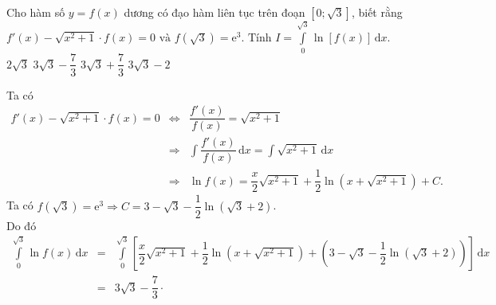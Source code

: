 \begin{ex}%
Cho hàm số $ y = f(x) $	 dương có đạo hàm  liên tục trên đoạn $ \left[0; \sqrt{3}\right] $, biết rằng $ f'(x) - \sqrt{x^2 + 1} \cdot f(x) = 0  \text{ và }  f\left(\sqrt{3}\right) = \mathrm{e}^3. \text{ Tính }  I = \displaystyle \int\limits_{0}^{\sqrt{3}} \ln \left[f(x)\right] \mathrm{\,d}x. $
	\choice
	{$ 2\sqrt{3} $}
	{\True $ 3 \sqrt{3} - \dfrac{7}{3} $}
	{$ 3 \sqrt{3} + \dfrac{7}{3} $}
	{$ 3 \sqrt{3} - 2 $}
	\loigiai
{
Ta có 
\begin{eqnarray*}
f'(x) - \sqrt{x^2 + 1} \cdot f(x) = 0 &\Leftrightarrow& \dfrac{f'(x)}{f(x)} = \sqrt{x^2 + 1}\\&\Rightarrow& \displaystyle \int \dfrac{f'(x)}{f(x)} \mathrm{\,d}x = \int \sqrt{x^2 + 1} \mathrm{\,d}x\\
&\Rightarrow & \ln f(x) = \dfrac{x}{2} \sqrt{x^2 + 1} +\dfrac{1}{2} \ln \left(x + \sqrt{x^2+1}\right)+C.
\end{eqnarray*}
Ta có $ f\left(\sqrt{3}\right) = \mathrm{e}^3 \Rightarrow C = 3 - \sqrt{3} - \dfrac{1}{2}\ln \left(\sqrt{3} + 2\right) $.\\
Do đó 
\begin{eqnarray*}
\displaystyle \int\limits_{0}^{\sqrt{3}} \ln f(x) \mathrm{\,d}x &=& \int\limits_{0}^{\sqrt{3}} \left[\dfrac{x}{2} \sqrt{x^2+1}  + \displaystyle \dfrac{1}{2} \ln \left(x + \sqrt{x^2 + 1}\right) + \displaystyle  \left(3-\sqrt{3} -\dfrac{1}{2}\ln\left(\sqrt{3}+2\right)\right)\right] \mathrm{\,d}x\\ &=& 3 \sqrt{3} - \dfrac{7}{3} \cdot
\end{eqnarray*}
	
}
\end{ex}

